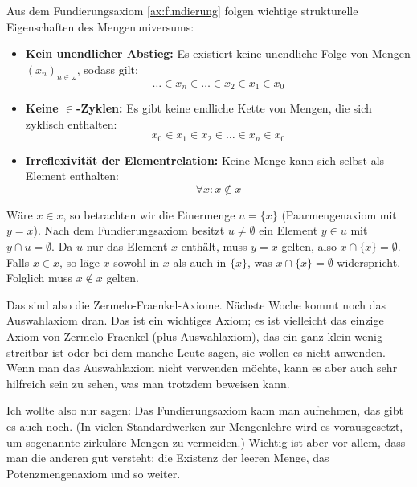 \begin{math-stroke}
Aus dem Fundierungsaxiom \ref{ax:fundierung} folgen wichtige strukturelle Eigenschaften des Mengenuniversums:
\begin{itemize}
    \item \textbf{Kein unendlicher Abstieg:} Es existiert keine unendliche Folge von Mengen $(x_n)_{n \in \omega}$, sodass gilt:
    \[ \dots \in x_n \in \dots \in x_2 \in x_1 \in x_0 \]
    \item \textbf{Keine $\in$-Zyklen:} Es gibt keine endliche Kette von Mengen, die sich zyklisch enthalten:
    \[ x_0 \in x_1 \in x_2 \in \dots \in x_n \in x_0 \]
    \item \textbf{Irreflexivität der Elementrelation:} Keine Menge kann sich selbst als Element enthalten:
    \[ \forall x \colon x \notin x \]
\end{itemize}

\begin{explanation-of-steps}
Wäre $x \in x$, so betrachten wir die Einermenge $u = \{x\}$ (Paarmengenaxiom mit $y=x$). Nach dem Fundierungsaxiom besitzt $u \neq \emptyset$ ein Element $y \in u$ mit $y \cap u = \emptyset$. Da $u$ nur das Element $x$ enthält, muss $y = x$ gelten, also $x \cap \{x\} = \emptyset$. Falls $x \in x$, so läge $x$ sowohl in $x$ als auch in $\{x\}$, was $x \cap \{x\} = \emptyset$ widerspricht. Folglich muss $x \notin x$ gelten.
\end{explanation-of-steps}
\end{math-stroke}

\begin{spoken-clean}[00:08:22 - 00:09:01]
Das sind also die Zermelo-Fraenkel-Axiome. Nächste Woche kommt noch das Auswahlaxiom dran. Das ist ein wichtiges Axiom; es ist vielleicht das einzige Axiom von Zermelo-Fraenkel (plus Auswahlaxiom), das ein ganz klein wenig streitbar ist oder bei dem manche Leute sagen, sie wollen es nicht anwenden. Wenn man das Auswahlaxiom nicht verwenden möchte, kann es aber auch sehr hilfreich sein zu sehen, was man trotzdem beweisen kann.

Ich wollte also nur sagen: Das Fundierungsaxiom kann man aufnehmen, das gibt es auch noch. (In vielen Standardwerken zur Mengenlehre wird es vorausgesetzt, um sogenannte zirkuläre Mengen zu vermeiden.) Wichtig ist aber vor allem, dass man die anderen gut versteht: die Existenz der leeren Menge, das Potenzmengenaxiom und so weiter.
\end{spoken-clean}

